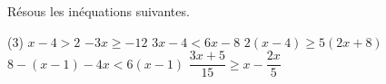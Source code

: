 %
%
    Résous les inéquations suivantes.
    \begin{tasks}(3)
        \task $x-4 > 2$
        \task $-3x \ge -12$
        \task $3x-4 < 6x-8$
        \task $2(x-4) \ge 5(2x+8)$
        \task $8-(x-1)-4x < 6(x-1)$
        \task $\dfrac{3x+5}{15}\ge x - \dfrac{2x}{5}$
    \end{tasks}
